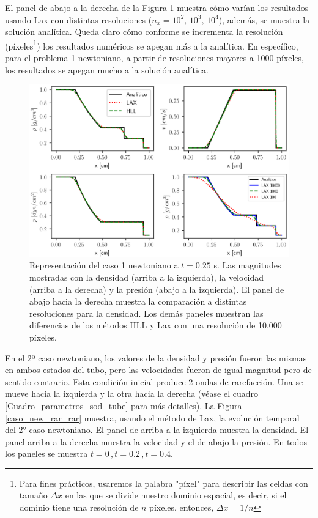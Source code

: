 \documentclass[12pt,a4paper]{book}
\begin{document}
El panel de abajo a la derecha de la Figura 
\ref{comparacion_analitico_newtoniano_caso_1} muestra cómo varían los resultados
usando Lax con distintas resoluciones ($n_x = 10^2, \, 10^3, \,10^4$), además, se muestra la solución
analítica.
Queda claro cómo 
conforme se incrementa la resolución (píxeles\footnote{Para fines prácticos, usaremos la palabra "píxel" para describir las celdas con tamaño $\Delta x$ en 
las que se divide nuestro dominio espacial, es decir, si el dominio tiene una resolución de $n$ 
píxeles, entonces, $\Delta x = 1/n$ }) los resultados numéricos se apegan más a la analítica. 
En específico, para el problema 1 newtoniano, a partir de resoluciones mayores a 1000 píxeles,
los resultados 
se apegan mucho a la solución analítica.

\begin{figure}
  \centering
    \includegraphics[width=1.0\textwidth]{./Figuras/capitulo_3/rarefaction.png}
  \caption{Representación del caso 1 newtoniano a $t = 0.25$ s. Las magnitudes mostradas con
  la densidad (arriba a la izquierda), la velocidad (arriba a la derecha) y la presión (abajo a la 
  izquierda).
  El panel de abajo hacia la derecha muestra la comparación a distintas resoluciones para la densidad. Los demás paneles muestran
  las diferencias de los métodos HLL y Lax con una resolución de 10,000 píxeles.
  \label{comparacion_analitico_newtoniano_caso_1}}
\end{figure}

En el 2º caso newtoniano, los valores de la densidad y presión fueron las mismas en ambos estados del tubo, pero las velocidades fueron de igual magnitud
pero de sentido contrario. Esta condición inicial produce 2 ondas de rarefacción. Una se mueve hacia
la izquierda y la otra hacia la derecha (véase el cuadro \ref{Cuadro_parametros_sod_tube} para más
detalles).
La Figura \ref{caso_new_rar_rar} muestra, usando
el método de Lax, la evolución temporal del 2° caso newtoniano. El panel de arriba a la izquierda muestra la densidad.
El panel arriba a la derecha muestra la velocidad y el de abajo la presión. En todos los paneles se 
muestra $t = 0 \, , t = 0.2 \, ,t = 0.4$.
\end{document}
